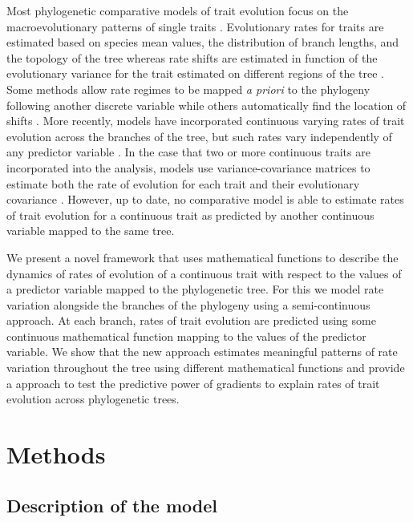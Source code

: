 Most phylogenetic comparative models of trait evolution focus on the macroevolutionary patterns of single traits \citep{butler_phylogenetic_2004, omeara_testing_2006, Eastman_2011, rabosky_analysis_2014, Uyeda_BayOU}. Evolutionary rates for traits are estimated based on species mean values, the distribution of branch lengths, and the topology of the tree whereas rate shifts are estimated in function of the evolutionary variance for the trait estimated on different regions of the tree \citep{omeara_testing_2006, Eastman_2011}. Some methods allow rate regimes to be mapped \textit{a priori} to the phylogeny following another discrete variable \citep{butler_phylogenetic_2004, omeara_testing_2006} while others automatically find the location of shifts \citep{Eastman_2011, rabosky_analysis_2014, Uyeda_BayOU}. More recently, models have incorporated continuous varying rates of trait evolution across the branches of the tree, but such rates vary independently of any predictor variable \citep{rabosky_analysis_2014}. In the case that two or more continuous traits are incorporated into the analysis, models use variance-covariance matrices to estimate both the rate of evolution for each trait and their evolutionary covariance \citep{revell_phylogenetic_2009, bartoszek_phylogenetic_2012, Clavel_mvmorph, caetano_sysbio_2017}. However, up to date, no comparative model is able to estimate rates of trait evolution for a continuous trait as predicted by another continuous variable mapped to the same tree.

We present a novel framework that uses mathematical functions to describe the dynamics of rates of evolution of a continuous trait with respect to the values of a predictor variable mapped to the phylogenetic tree. For this we model rate variation alongside the branches of the phylogeny using a semi-continuous approach. At each branch, rates of trait evolution are predicted using some continuous mathematical function mapping to the values of the predictor variable. We show that the new approach estimates meaningful patterns of rate variation throughout the tree using different mathematical functions and provide a approach to test the predictive power of gradients to explain rates of trait evolution across phylogenetic trees.

\section{Methods}

\subsection{Description of the model}

